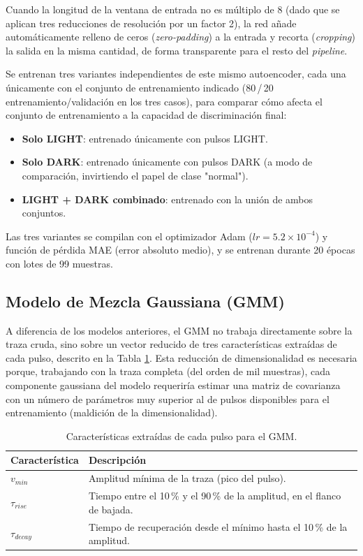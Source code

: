 Cuando la longitud de la ventana de entrada no es múltiplo de 8 (dado que se aplican tres reducciones de resolución por un factor 2), la red añade automáticamente relleno de ceros (\textit{zero-padding}) a la entrada y recorta (\textit{cropping}) la salida en la misma cantidad, de forma transparente para el resto del \textit{pipeline}.

Se entrenan tres variantes independientes de este mismo autoencoder, cada una únicamente con el conjunto de entrenamiento indicado (80\,/\,20 entrenamiento/validación en los tres casos), para comparar cómo afecta el conjunto de entrenamiento a la capacidad de discriminación final:

\begin{itemize}
	\item \textbf{Solo LIGHT}: entrenado únicamente con pulsos LIGHT.
	\item \textbf{Solo DARK}: entrenado únicamente con pulsos DARK (a modo de comparación, invirtiendo el papel de clase "normal").
	\item \textbf{LIGHT + DARK combinado}: entrenado con la unión de ambos conjuntos.
\end{itemize}

Las tres variantes se compilan con el optimizador Adam ($lr=5.2\times10^{-4}$) y función de pérdida MAE (error absoluto medio), y se entrenan durante 20 épocas con lotes de 99 muestras.

\subsection{Modelo de Mezcla Gaussiana (GMM)}
\label{sec:gmm}

A diferencia de los modelos anteriores, el GMM no trabaja directamente sobre la traza cruda, sino sobre un vector reducido de tres características extraídas de cada pulso, descrito en la Tabla \ref{tab:features-gmm}. Esta reducción de dimensionalidad es necesaria porque, trabajando con la traza completa (del orden de mil muestras), cada componente gaussiana del modelo requeriría estimar una matriz de covarianza con un número de parámetros muy superior al de pulsos disponibles para el entrenamiento (maldición de la dimensionalidad).

\begin{table}[h]
	\centering
	\caption{Características extraídas de cada pulso para el GMM.}
	\label{tab:features-gmm}
	\begin{tabular}{ll}
		\toprule
		Característica & Descripción \\
		\midrule
		$v_{min}$ & Amplitud mínima de la traza (pico del pulso). \\
		$\tau_{rise}$ & Tiempo entre el 10\,\% y el 90\,\% de la amplitud, en el flanco de bajada. \\
		$\tau_{decay}$ & Tiempo de recuperación desde el mínimo hasta el 10\,\% de la amplitud. \\
		\bottomrule
	\end{tabular}
\end{table}

